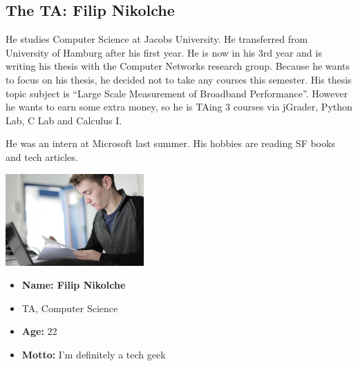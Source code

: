 \subsection{The TA: Filip Nikolche}

He studies Computer Science at Jacobs University. He transferred from University of Hamburg after his first year. He is now in his 3rd year and is writing his thesis with the Computer Networks research group.
Because he wants to focus on his thesis, he decided not to take any courses this semester. His thesis topic subject is ``Large Scale Measurement of Broadband Performance''. However he wants to earn some extra money, so he is TAing 3 courses via jGrader, Python Lab, C Lab and Calculus I.

He was an intern at Microsoft last summer. His hobbies are reading SF books and tech articles.


\begin{center}
  \includegraphics[width=200px]{personas/filip.png}
\end{center}

\begin{itemize}
  \item \textbf{Name: Filip Nikolche}
  \item TA, Computer Science
  \item \textbf{Age:} 22
  \item \textbf{Motto:} I'm definitely a tech geek
\end{itemize}
